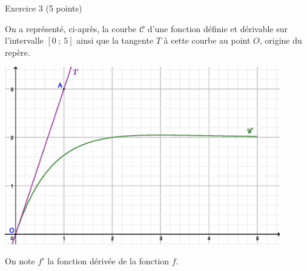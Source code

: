 
%
\begin{h2}Exercice 3 (5 points)\end{h2}
\par
On a représenté, ci-après, la courbe $\mathscr{C}$ d'une fonction définie et dérivable sur l'intervalle $[0~;~5]$ ainsi que la tangente $T$ à cette courbe au point $O$, origine du repère.
\par
\begin{center}
     \begin{extern}%
          \includegraphics[width=0.9\textwidth]{images/BBESL-s3-3-1}%
     \end{extern}
\end{center}
\begin{center}
\end{center}
\par
On note $f'$ la fonction dérivée de la fonction $f$.
\par
%
%
\par
